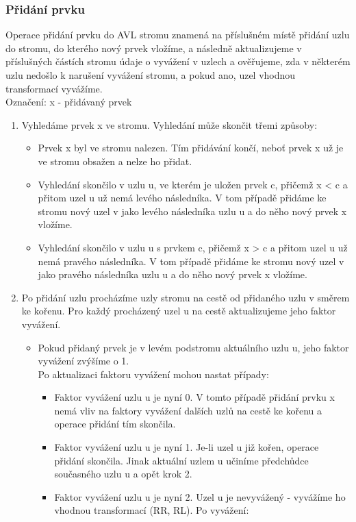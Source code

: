 \documentclass[10pt,a4paper]{article}
\begin{document}
\subsubsection{Přidání prvku}
Operace přidání prvku do AVL stromu znamená na příslušném místě přidání uzlu do stromu, do kterého nový prvek vložíme, a následně aktualizujeme v příslušných částích stromu údaje o vyvážení v uzlech a ověřujeme, zda v některém uzlu nedošlo k narušení vyvážení stromu, a pokud ano, uzel vhodnou transformací vyvážíme. \\
Označení: x - přidávaný prvek
\begin{enumerate}
	\item Vyhledáme prvek x ve stromu. Vyhledání může skončit třemi způsoby:
	\begin{itemize}
		\item Prvek x byl ve stromu nalezen. Tím přidávání končí, neboť prvek x už je ve stromu obsažen a nelze ho přidat.
		\item Vyhledání skončilo v uzlu u, ve kterém je uložen prvek c, přičemž x < c a přitom uzel u už nemá levého následníka. V tom případě přidáme ke stromu nový uzel v jako levého následníka uzlu u a do něho nový prvek x vložíme.
		\item Vyhledání skončilo v uzlu u s prvkem c, přičemž x > c a přitom uzel u už nemá pravého následníka. V tom případě přidáme ke stromu nový uzel v jako pravého následníka uzlu u a do něho nový prvek x vložíme.
	\end{itemize}
	\item Po přidání uzlu procházíme uzly stromu na cestě od přidaného uzlu v směrem ke kořenu. Pro každý procházený uzel u na cestě aktualizujeme jeho faktor vyvážení.
	\begin{itemize}
		\item Pokud přidaný prvek je v levém podstromu aktuálního uzlu u, jeho faktor vyvážení zvýšíme o 1. \\
		Po aktualizaci faktoru vyvážení mohou nastat případy:
		\begin{itemize}
			\item Faktor vyvážení uzlu u je nyní 0. V tomto případě přidání prvku x nemá vliv na faktory vyvážení dalších uzlů na cestě ke kořenu a operace přidání tím skončila.
			\item Faktor vyvážení uzlu u je nyní 1. Je-li uzel u již kořen, operace přidání skončila. Jinak aktuální uzlem u učiníme předchůdce současného uzlu u a opět krok 2.
			\item Faktor vyvážení uzlu u je nyní 2. Uzel u je nevyvážený - vyvážíme ho vhodnou transformací (RR, RL). Po vyvážení:

\end{itemize}
\end{itemize}
\end{enumerate}
\end{document}
